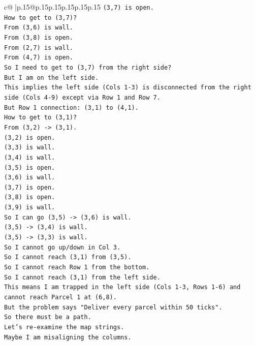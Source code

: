 \documentclass{article}
\begin{document}
{\begin{supertabular}{c@{$\;$}|p{.15\linewidth}@{}p{.15\linewidth}p{.15\linewidth}p{.15\linewidth}p{.15\linewidth}p{.15\linewidth}}
{{{\texttt{(3,7) is open.} \\
\texttt{How to get to (3,7)?} \\
\texttt{From (3,6) is wall.} \\
\texttt{From (3,8) is open.} \\
\texttt{From (2,7) is wall.} \\
\texttt{From (4,7) is open.} \\
\texttt{So I need to get to (3,7) from the right side?} \\
\texttt{But I am on the left side.} \\
\texttt{This implies the left side (Cols 1{-}3) is disconnected from the right side (Cols 4{-}9) except via Row 1 and Row 7.} \\
\texttt{But Row 1 connection: (3,1) to (4,1).} \\
\texttt{How to get to (3,1)?} \\
\texttt{From (3,2) {-}> (3,1).} \\
\texttt{(3,2) is open.} \\
\texttt{(3,3) is wall.} \\
\texttt{(3,4) is wall.} \\
\texttt{(3,5) is open.} \\
\texttt{(3,6) is wall.} \\
\texttt{(3,7) is open.} \\
\texttt{(3,8) is open.} \\
\texttt{(3,9) is wall.} \\
\texttt{So I can go (3,5) {-}> (3,6) is wall.} \\
\texttt{(3,5) {-}> (3,4) is wall.} \\
\texttt{(3,5) {-}> (3,3) is wall.} \\
\texttt{So I cannot go up/down in Col 3.} \\
\texttt{So I cannot reach (3,1) from (3,5).} \\
\texttt{So I cannot reach Row 1 from the bottom.} \\
\texttt{So I cannot reach (3,1) from the left side.} \\
\texttt{This means I am trapped in the left side (Cols 1{-}3, Rows 1{-}6) and cannot reach Parcel 1 at (6,8).} \\
\texttt{But the problem says "Deliver every parcel within 50 ticks".} \\
\texttt{So there must be a path.} \\
\texttt{Let's re{-}examine the map strings.} \\
\texttt{Maybe I am misaligning the columns.} \\
}}}
\end{supertabular}}
\end{document}
